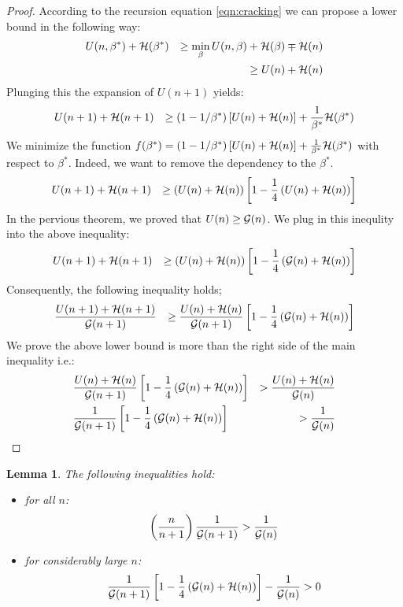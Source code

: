 \documentclass{article}
\newtheorem{lemma}{Lemma}
\newcommand{\bound}{{\cal H}}
\newcommand{\ERMbound}{{\cal G}}
\begin{document}
\begin{proof}
According to the recursion equation \ref{eqn:cracking} we can propose a lower
bound in the following way: 
\begin{eqnarray*}
	 & U(n,\beta^*) + \bound(\beta^*) & \geq \min_{\beta}
	 U(n,\beta) + \bound(\beta) \mp \bound(n) \\ 
	 & & \geq U(n) + \bound(n)
\end{eqnarray*}
Plunging this the expansion of $U(n+1)$ yields: 
\begin{eqnarray*}
	& U(n+1) + \bound(n+1) & \geq (1-1/\beta^*)\left[ U(n) + \bound(n)\right] +
	\frac{1}{\beta^*} \bound(\beta^*) 
\end{eqnarray*}
We minimize the function $f(\beta^*) =  (1-1/\beta^*)\left[ U(n) + \bound(n)\right] +
	\frac{1}{\beta^*} \bound(\beta^*) $
with respect to $\beta^*$. Indeed, we want to remove the dependency to the
$\beta^*$.
\begin{eqnarray*}
	& U(n+1) + \bound(n+1) & \geq \left( U(n) + \bound(n)\right) \left[1 -
	\frac{1	}{4} \left( U(n) + \bound(n)\right)  \right]
\end{eqnarray*}
In the pervious theorem, we proved that $U(n) \geq \ERMbound(n)$. We plug in
this inequlity into the above inequality: 
\begin{eqnarray*}
	& U(n+1) + \bound(n+1) & \geq \left( U(n) + \bound(n)\right) \left[1 -
	\frac{1	}{4} \left( \ERMbound(n) + \bound(n)\right)  \right]
\end{eqnarray*}
Consequently, the following inequality holds; 
\begin{eqnarray*}
	& \frac{U(n+1) + \bound(n+1)}{\ERMbound(n+1)} & \geq \frac{ U(n) +
	\bound(n)}{\ERMbound(n+1)}
	\left[1 - \frac{1	}{4} \left( \ERMbound(n) + \bound(n)\right)  \right]
\end{eqnarray*}
We prove the above lower bound is more than the right side of the main
inequality i.e.: 
\begin{eqnarray*}
	& \frac{ U(n) +
	\bound(n)}{\ERMbound(n+1)}
	\left[1 - \frac{1	}{4} \left( \ERMbound(n) + \bound(n)\right)  \right] & >
	\frac{U(n)+\bound(n)}{\ERMbound(n)} \\ 
	& \frac{1}{\ERMbound(n+1)}
	\left[1 - \frac{1	}{4} \left( \ERMbound(n) + \bound(n)\right)  \right] & >
	\frac{1}{\ERMbound(n)}
\end{eqnarray*}
\end{proof}
\begin{lemma} \label{lemma:gn_ineq}
	The following inequalities hold: 
	\begin{itemize}
	  \item for all $n$:
	  \begin{equation*}
		\left( \frac{n}{n+1}\right) \frac{1}{\ERMbound(n+1)}  > 
	\frac{1}{\ERMbound(n)}
	\end{equation*}
	\item for considerably large $n$:
	\begin{equation*}
		\frac{1}{\ERMbound(n+1)}
	\left[1 - \frac{1	}{4} \left( \ERMbound(n) + \bound(n)\right)  \right] - 
	\frac{1}{\ERMbound(n)} > 0

	\end{equation*}
	\end{itemize}
	
\end{lemma}
\end{document}
